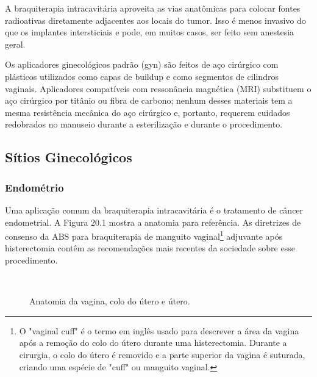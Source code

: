 \documentclass[11pt,a4paper]{article}
\begin{document}
	A braquiterapia intracavitária aproveita as vias anatômicas para colocar fontes radioativas diretamente adjacentes aos locais do tumor. Isso é menos invasivo do que os implantes intersticiais e pode, em muitos casos, ser feito sem anestesia geral.

	Os aplicadores ginecológicos padrão (gyn) são feitos de aço cirúrgico com plásticos utilizados como capas de buildup e como segmentos de cilindros vaginais. Aplicadores compatíveis com ressonância magnética (MRI) substituem o aço cirúrgico por titânio ou fibra de carbono; nenhum desses materiais tem a mesma resistência mecânica do aço cirúrgico e, portanto, requerem cuidados redobrados no manuseio durante a esterilização e durante o procedimento.

\subsection{Sítios Ginecológicos}

\subsubsection*{Endométrio}

	Uma aplicação comum da braquiterapia intracavitária é o tratamento de câncer endometrial. A Figura 20.1 mostra a anatomia para referência. As diretrizes de consenso da ABS para braquiterapia de manguito vaginal\footnote{O "vaginal cuff" é o termo em inglês usado para descrever a área da vagina após a remoção do colo do útero durante uma histerectomia. Durante a cirurgia, o colo do útero é removido e a parte superior da vagina é suturada, criando uma espécie de "cuff" ou manguito vaginal.} adjuvante após histerectomia contêm as recomendações mais recentes da sociedade sobre esse procedimento.

	\begin{figure}[h]
		\centering
		 \\ %
		\caption{Anatomia da vagina, colo do útero e útero.}
		\label{fig:AnatomiaGineco}
	\end{figure}
\end{document}
